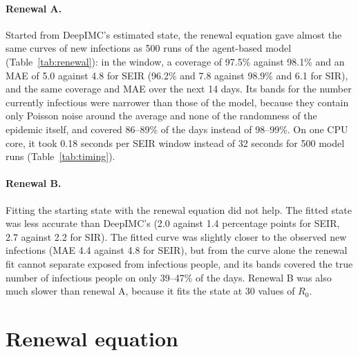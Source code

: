 \documentclass[12pt]{article}
\begin{document}
\paragraph{Renewal A.} Started from DeepIMC's estimated state, the renewal equation gave almost the same
curves of new infections as 500 runs of the agent-based model (Table~\ref{tab:renewal}): in the window, a
coverage of 97.5\% against 98.1\% and an MAE of 5.0 against 4.8 for SEIR (96.2\% and 7.8 against 98.9\% and
6.1 for SIR), and the same coverage and MAE over the next 14 days. Its bands for the number currently infectious were narrower than those of the model, because
they contain only Poisson noise around the average and none of the randomness of the epidemic itself, and
covered 86--89\% of the days instead of 98--99\%. On one CPU core, it took 0.18 seconds per SEIR window
instead of 32 seconds for 500 model runs (Table~\ref{tab:timing}).

\paragraph{Renewal B.} Fitting the starting state with the renewal equation did not help. The fitted state was
less accurate than DeepIMC's (2.0 against 1.4 percentage points for SEIR, 2.7 against 2.2 for SIR). The fitted
curve was slightly closer to the observed new infections (MAE 4.4 against 4.8 for SEIR), but from the curve
alone the renewal fit cannot separate exposed from infectious people, and its bands covered the true number of
infectious people on only 39--47\% of the days. Renewal B was also much slower than renewal A, because it fits
the state at 30 values of $R_0$.

\begin{table}[htbp]
\centering
\caption{From DeepIMC's estimates to curves on the simulated test windows: 500 runs of the agent-based
model, or the renewal equation started from DeepIMC's state (A) or from a state fitted by the renewal
equation (B). Starting-state error (percentage points); coverage (\%) of the true curves and MAE of the
median curve; seconds per window during the evaluation, on shared computers (Table~\ref{tab:timing}
compares the times on one dedicated core).}
\label{tab:renewal}
\small
\resizebox{\textwidth}{!}{}
\end{table}

\section{Renewal equation}\label{app:renewal}
\end{document}
